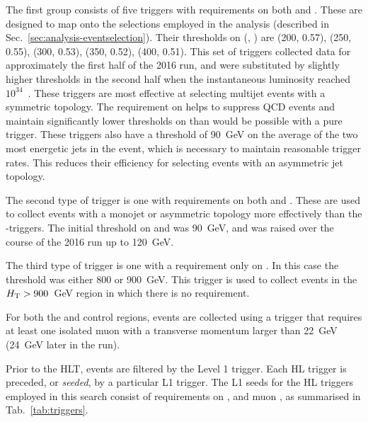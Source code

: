 The first group consists of five triggers with requirements on both \scalht and 
\alphat. These are designed to map onto the selections employed in the 
analysis (described in Sec.~\ref{sec:analysis-eventselection}). Their 
thresholds on (\scalht, \alphat) are (200, 0.57), (250, 0.55), (300, 0.53), 
(350, 0.52), (400, 0.51). This set of triggers collected data for approximately 
the first half of the 2016 run, and were substituted by slightly higher \alphat 
thresholds in the second half when the instantaneous luminosity reached 
$10^{34}$~\lumiunits. 
These triggers are most effective at selecting multijet events with a symmetric 
topology. The requirement on \alphat helps to suppress QCD events and maintain 
significantly lower thresholds on \scalht than would be possible with a pure 
\scalht trigger.
These triggers also have a threshold of 90~GeV on the average \pt of the two 
most energetic jets in the event, which is necessary to maintain reasonable 
trigger rates. This reduces their efficiency for selecting events with an 
asymmetric jet topology.

The second type of trigger is one with requirements on both \met and \mht. 
These are used to collect events with a monojet or asymmetric topology more 
effectively than the \scalht-\alphat triggers. The initial threshold on \met 
and \mht was 90~GeV, and was raised over the course of the 2016 run up to 
120~GeV.

The third type of trigger is one with a requirement only on \scalht. In this 
case the threshold was either 800 or 900~GeV. This trigger is used to collect 
events in the $\mbox{$H_\text{T}$}>900$~GeV region in which there is no \alphat requirement.

For both the \mj and \mmj control regions, events are collected using a trigger 
that requires at least one isolated muon with a transverse momentum larger than 
22~GeV (24~GeV later in the run).

Prior to the HLT, events are filtered by the Level 1 trigger. Each HL trigger 
is preceded, or \textit{seeded}, by a particular L1 trigger. The L1 seeds for 
the HL triggers employed in this search consist of requirements on \scalht, 
\met and muon \pt, as summarised in Tab.~\ref{tab:triggers}. 

